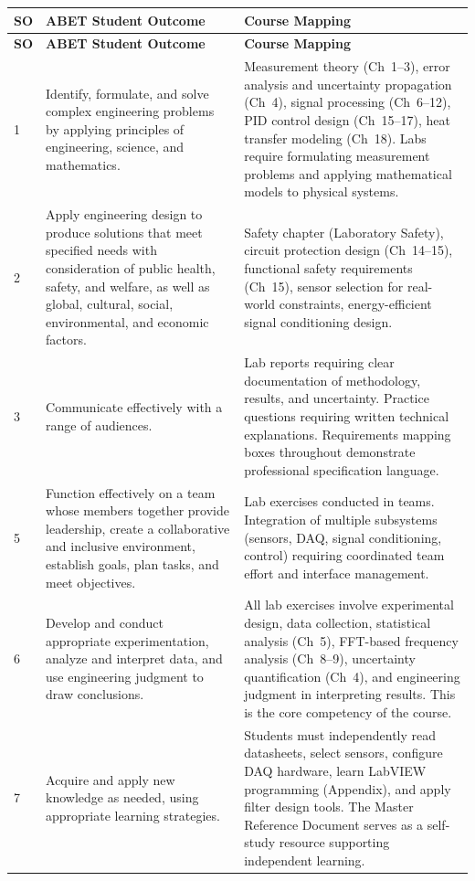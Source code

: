 \documentclass[11pt,letterpaper,twoside,openany]{book}
\begin{document}
\begin{center}
\begin{longtable}{p{0.8cm}p{5.5cm}p{5.5cm}}
\toprule
\textbf{SO} & \textbf{ABET Student Outcome} & \textbf{Course Mapping} \\
\midrule
\endfirsthead
\toprule
\textbf{SO} & \textbf{ABET Student Outcome} & \textbf{Course Mapping} \\
\midrule
\endhead
1 & Identify, formulate, and solve complex engineering problems by applying principles of engineering, science, and mathematics. & Measurement theory (Ch~1--3), error analysis and uncertainty propagation (Ch~4), signal processing (Ch~6--12), PID control design (Ch~15--17), heat transfer modeling (Ch~18). Labs require formulating measurement problems and applying mathematical models to physical systems. \\
\midrule
2 & Apply engineering design to produce solutions that meet specified needs with consideration of public health, safety, and welfare, as well as global, cultural, social, environmental, and economic factors. & Safety chapter (Laboratory Safety), circuit protection design (Ch~14--15), functional safety requirements (Ch~15), sensor selection for real-world constraints, energy-efficient signal conditioning design. \\
\midrule
3 & Communicate effectively with a range of audiences. & Lab reports requiring clear documentation of methodology, results, and uncertainty. Practice questions requiring written technical explanations. Requirements mapping boxes throughout demonstrate professional specification language. \\
\midrule
5 & Function effectively on a team whose members together provide leadership, create a collaborative and inclusive environment, establish goals, plan tasks, and meet objectives. & Lab exercises conducted in teams. Integration of multiple subsystems (sensors, DAQ, signal conditioning, control) requiring coordinated team effort and interface management. \\
\midrule
6 & Develop and conduct appropriate experimentation, analyze and interpret data, and use engineering judgment to draw conclusions. & All lab exercises involve experimental design, data collection, statistical analysis (Ch~5), FFT-based frequency analysis (Ch~8--9), uncertainty quantification (Ch~4), and engineering judgment in interpreting results. This is the core competency of the course. \\
\midrule
7 & Acquire and apply new knowledge as needed, using appropriate learning strategies. & Students must independently read datasheets, select sensors, configure DAQ hardware, learn LabVIEW programming (Appendix), and apply filter design tools. The Master Reference Document serves as a self-study resource supporting independent learning. \\
\bottomrule
\end{longtable}
\end{center}
\end{document}
